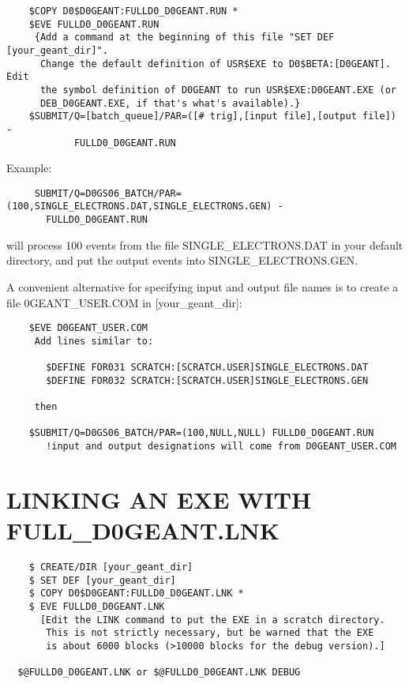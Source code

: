 \begin{verbatim}
    $COPY D0$D0GEANT:FULLD0_D0GEANT.RUN *
    $EVE FULLD0_D0GEANT.RUN
     {Add a command at the beginning of this file "SET DEF [your_geant_dir]".
      Change the default definition of USR$EXE to D0$BETA:[D0GEANT]. Edit
      the symbol definition of D0GEANT to run USR$EXE:D0GEANT.EXE (or
      DEB_D0GEANT.EXE, if that's what's available).}
    $SUBMIT/Q=[batch_queue]/PAR=([# trig],[input file],[output file]) -
            FULLD0_D0GEANT.RUN
\end{verbatim}

    Example:

\begin{verbatim}
     SUBMIT/Q=D0GS06_BATCH/PAR=(100,SINGLE_ELECTRONS.DAT,SINGLE_ELECTRONS.GEN) -
       FULLD0_D0GEANT.RUN
\end{verbatim}
will process 100 events from the file SINGLE\_ELECTRONS.DAT in your default
directory, and put the output events into SINGLE\_ELECTRONS.GEN.

A convenient alternative for specifying input and output file names is to create
a file \D0GEANT\_USER.COM in [your\_geant\_dir]:

\begin{verbatim}
    $EVE D0GEANT_USER.COM
     Add lines similar to:

       $DEFINE FOR031 SCRATCH:[SCRATCH.USER]SINGLE_ELECTRONS.DAT
       $DEFINE FOR032 SCRATCH:[SCRATCH.USER]SINGLE_ELECTRONS.GEN

     then

    $SUBMIT/Q=D0GS06_BATCH/PAR=(100,NULL,NULL) FULLD0_D0GEANT.RUN
       !input and output designations will come from D0GEANT_USER.COM
\end{verbatim}

\section{LINKING AN EXE WITH FULL\_D0GEANT.LNK}
\label{link}

\begin{verbatim}
    $ CREATE/DIR [your_geant_dir]
    $ SET DEF [your_geant_dir]
    $ COPY D0$D0GEANT:FULLD0_D0GEANT.LNK *
    $ EVE FULLD0_D0GEANT.LNK
      [Edit the LINK command to put the EXE in a scratch directory.
       This is not strictly necessary, but be warned that the EXE
       is about 6000 blocks (>10000 blocks for the debug version).]

  $@FULLD0_D0GEANT.LNK or $@FULLD0_D0GEANT.LNK DEBUG
\end{verbatim}

